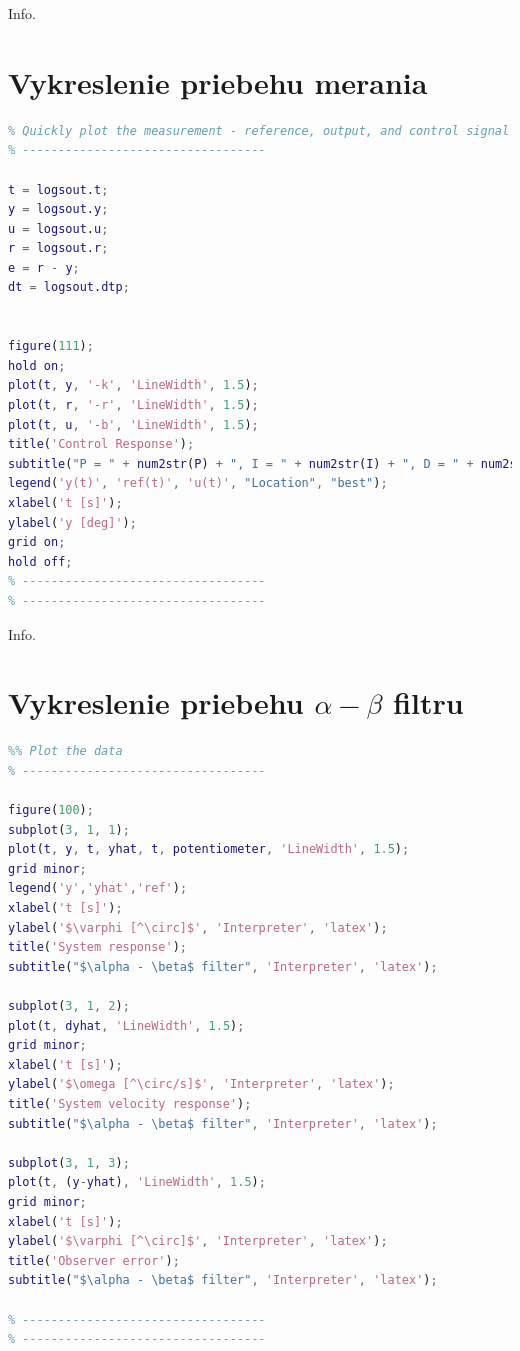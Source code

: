 \documentclass[a4paper, 10pt, ]{article}
\begin{document}
Info.

\section{Vykreslenie priebehu merania}
\begin{lstlisting}[caption=Vykreslenie základných veličín procesu merania., label={code:plot_basic}, language=Matlab]
% ----------------------------------
% Quickly plot the measurement - reference, output, and control signal
% ----------------------------------

t = logsout.t;
y = logsout.y;
u = logsout.u;
r = logsout.r;
e = r - y;
dt = logsout.dtp;


figure(111);
hold on;
plot(t, y, '-k', 'LineWidth', 1.5);
plot(t, r, '-r', 'LineWidth', 1.5);
plot(t, u, '-b', 'LineWidth', 1.5);
title('Control Response');
subtitle("P = " + num2str(P) + ", I = " + num2str(I) + ", D = " + num2str(D));
legend('y(t)', 'ref(t)', 'u(t)', "Location", "best");
xlabel('t [s]');
ylabel('y [deg]');
grid on;
hold off;
% ----------------------------------
% ----------------------------------
\end{lstlisting}

Info.

\section{Vykreslenie priebehu $\alpha-\beta$ filtru}
\begin{lstlisting}[caption=Vykreslenie priebehu a porovnania odhadu stavu pomocou $\alpha-\beta$ filtra., label={code:plot_obs}, language=Matlab]
% ----------------------------------
%% Plot the data
% ----------------------------------

figure(100);
subplot(3, 1, 1);
plot(t, y, t, yhat, t, potentiometer, 'LineWidth', 1.5);
grid minor;
legend('y','yhat','ref');
xlabel('t [s]');
ylabel('$\varphi [^\circ]$', 'Interpreter', 'latex');
title('System response');
subtitle("$\alpha - \beta$ filter", 'Interpreter', 'latex');

subplot(3, 1, 2);
plot(t, dyhat, 'LineWidth', 1.5);
grid minor;
xlabel('t [s]');
ylabel('$\omega [^\circ/s]$', 'Interpreter', 'latex');
title('System velocity response');
subtitle("$\alpha - \beta$ filter", 'Interpreter', 'latex');

subplot(3, 1, 3);
plot(t, (y-yhat), 'LineWidth', 1.5);
grid minor;
xlabel('t [s]');
ylabel('$\varphi [^\circ]$', 'Interpreter', 'latex');
title('Observer error');
subtitle("$\alpha - \beta$ filter", 'Interpreter', 'latex');

% ----------------------------------
% ----------------------------------
\end{lstlisting}
\end{document}
